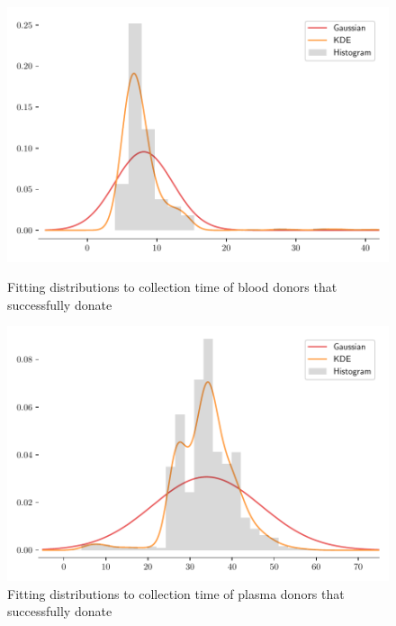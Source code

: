 \documentclass[a4paper,12pt]{article}
\begin{document}
\begin{figure}[H]
    \begin{minipage}[t]{0.5\textwidth}
        \centering
        \includegraphics[scale=0.48]{blood_collection_time.pdf}
        \begin{minipage}[t]{0.9\textwidth}
            \centering
            \caption{Fitting distributions to collection time of blood donors that successfully donate}
            \label{firstfit}
        \end{minipage}
    \end{minipage}%
    \begin{minipage}[t]{0.5\textwidth}
        \centering
        \includegraphics[scale=0.48]{plasma_collection_time.pdf}
        \begin{minipage}[t]{0.9\textwidth}
            \centering
            \caption{Fitting distributions to collection time of plasma donors that successfully donate}
        \end{minipage}
    \end{minipage}
\end{figure}
\end{document}
